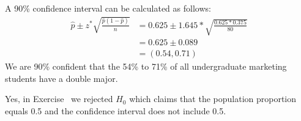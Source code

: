 %

{
A 90\% confidence interval can be calculated as follows:
\begin{align*}
\hat{p} \pm z^* \sqrt{\frac{\hat{p} (1 - \hat{p})}{n}} &= 0.625 \pm 1.645 * \sqrt{\frac{0.625 * 0.375}{80}} \\
&= 0.625 \pm 0.089 \\
&= (0.54, 0.71)
\end{align*}
We are 90\% confident that the 54\% to 71\% of all undergraduate marketing students have a double major.

Yes, in Exercise~ we rejected $H_0$ which claims that the population proportion equals 0.5 and the confidence interval does not include 0.5.
}

%

